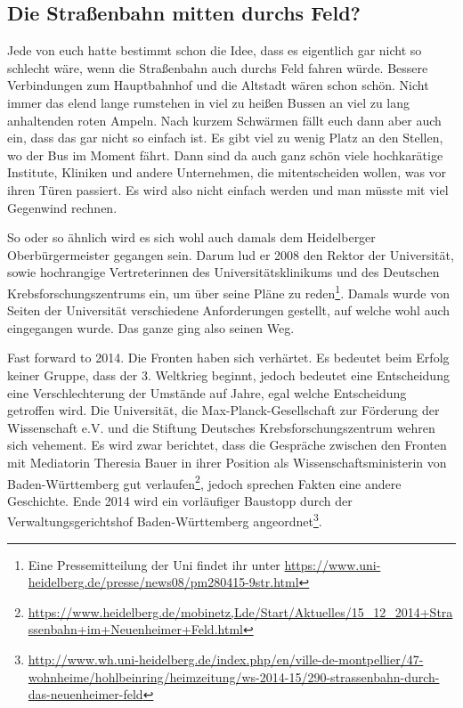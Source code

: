 \subsection{Die Straßenbahn mitten durchs Feld?}

Jede von euch hatte bestimmt schon die Idee, dass es eigentlich gar nicht so schlecht wäre, wenn die Straßenbahn auch durchs Feld fahren würde. Bessere Verbindungen zum Hauptbahnhof und die Altstadt wären schon schön. Nicht immer das elend lange rumstehen in viel zu heißen Bussen an viel zu lang anhaltenden roten Ampeln. Nach kurzem Schwärmen fällt euch dann aber auch ein, dass das gar nicht so einfach ist. Es gibt viel zu wenig Platz an den Stellen, wo der Bus im Moment fährt. Dann sind da auch ganz schön viele hochkarätige Institute, Kliniken und andere Unternehmen, die mitentscheiden wollen, was vor ihren Türen passiert. Es wird also nicht einfach werden und man müsste mit viel Gegenwind rechnen.

So oder so ähnlich wird es sich wohl auch damals dem Heidelberger Oberbürgermeister gegangen sein. Darum lud er 2008 den Rektor der Universität, sowie hochrangige Vertreterinnen des Universitätsklinikums und des Deutschen Krebsforschungszentrums ein, um über seine Pläne zu reden\footnote{Eine Pressemitteilung der Uni findet ihr unter \url{https://www.uni-heidelberg.de/presse/news08/pm280415-9str.html}}. Damals wurde von Seiten der Universität verschiedene Anforderungen gestellt, auf welche wohl auch eingegangen wurde. Das ganze ging also seinen Weg.

Fast forward to 2014. Die Fronten haben sich verhärtet. Es bedeutet beim Erfolg keiner Gruppe, dass der 3. Weltkrieg beginnt, jedoch bedeutet eine Entscheidung eine Verschlechterung der Umstände auf Jahre, egal welche Entscheidung getroffen wird. Die Universität, die Max-Planck-Gesellschaft zur Förderung der Wissenschaft e.V. und die Stiftung Deutsches Krebsforschungszentrum wehren sich vehement. Es wird zwar berichtet, dass die Gespräche zwischen den Fronten mit Mediatorin Theresia Bauer in ihrer Position als Wissenschaftsministerin von Baden-Württemberg gut verlaufen\footnote{\url{https://www.heidelberg.de/mobinetz,Lde/Start/Aktuelles/15_12_2014+Strassenbahn+im+Neuenheimer+Feld.html}}, jedoch sprechen Fakten eine andere Geschichte. Ende 2014 wird ein vorläufiger Baustopp durch der Verwaltungsgerichtshof Baden-Württemberg angeordnet\footnote{\url{http://www.wh.uni-heidelberg.de/index.php/en/ville-de-montpellier/47-wohnheime/hohlbeinring/heimzeitung/ws-2014-15/290-strassenbahn-durch-das-neuenheimer-feld}}.

